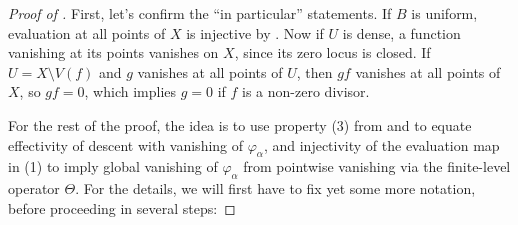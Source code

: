 \documentclass[10pt,twoside]{article}
\numberwithin{equation}{section}
\theoremstyle{plain}
\theoremstyle{definition}
\let \phi \varphi
\begin{document}
\begin{proof}[Proof of ]
First, let's confirm the ``in particular'' statements. If \(B\) is uniform, evaluation at all points of \(X\) is injective by \cite[Theorem 5.2.1]{SW20}. Now if \(U\) is dense, a function vanishing at its points vanishes on \(X\), since its zero locus is closed. If \(U=X\setminus V(f)\) and \(g\) vanishes at all points of \(U\), then \(gf\) vanishes at all points of \(X\), so \(gf=0\), which implies \(g=0\) if \(f\) is a non-zero divisor.\par
For the rest of the proof, the idea is to use property (3) from  and  to equate effectivity of descent with vanishing of \(\phi_\alpha\), and injectivity of the evaluation map in  (1) to imply global vanishing of \(\phi_\alpha\) from pointwise vanishing via the finite-level operator \(\Theta\). For the details, we will first have to fix yet some more notation, before proceeding in several steps:


\end{proof}
\end{document}
